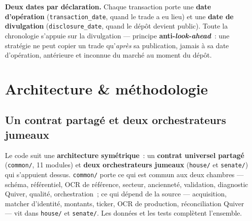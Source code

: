 \documentclass[11pt,a4paper]{article}
\newcommand{\co}[1]{\texttt{\small #1}}
\begin{document}
\textbf{Deux dates par déclaration.} Chaque transaction porte une \textbf{date d'opération}
(\co{transaction_date}, quand le trade a eu lieu) et une \textbf{date de divulgation} (\co{disclosure_date},
quand le dépôt devient public). Toute la chronologie s'appuie sur la divulgation — principe
\textbf{anti-\emph{look-ahead}}~: une stratégie ne peut copier un trade qu'\emph{après} sa publication,
jamais à sa date d'opération, antérieure et inconnue du marché au moment du dépôt.

\section{Architecture \& méthodologie}
\label{sec:archi}

\subsection{Un contrat partagé et deux orchestrateurs jumeaux}
\label{sec:archi-couches}
Le code suit une \textbf{architecture symétrique}~: un \textbf{contrat universel partagé} (\co{common/},
11 modules) et \textbf{deux orchestrateurs jumeaux} (\co{house/} et \co{senate/}) qui s'appuient dessus.
\co{common/} porte ce qui est commun aux deux chambres — schéma, référentiel, OCR de référence, secteur,
ancienneté, validation, diagnostic Quiver, qualité, orchestration~; ce qui dépend de la source —
acquisition, matcher d'identité, montants, ticker, OCR de production, réconciliation Quiver — vit dans
\co{house/} et \co{senate/}. Les données et les tests complètent l'ensemble.
\end{document}
